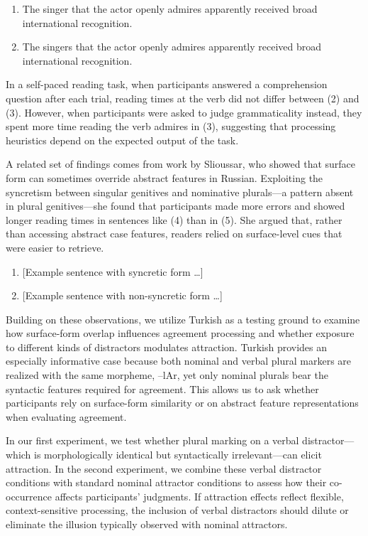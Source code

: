 \documentclass[
  authoryear,
  preprint]{elsarticle}
\providecommand{\tightlist}{%
  \setlength{\itemsep}{0pt}\setlength{\parskip}{0pt}}
\begin{document}
\begin{enumerate}
\def\labelenumi{\arabic{enumi}.}
\setcounter{enumi}{1}
\tightlist
\item
  The singer that the actor openly admires apparently received broad
  international recognition.
\item
  The singers that the actor openly admires apparently received broad
  international recognition.
\end{enumerate}

In a self-paced reading task, when participants answered a comprehension
question after each trial, reading times at the verb did not differ
between (2) and (3). However, when participants were asked to judge
grammaticality instead, they spent more time reading the verb admires in
(3), suggesting that processing heuristics depend on the expected output
of the task.

A related set of findings comes from work by Slioussar, who showed that
surface form can sometimes override abstract features in Russian.
Exploiting the syncretism between singular genitives and nominative
plurals---a pattern absent in plural genitives---she found that
participants made more errors and showed longer reading times in
sentences like (4) than in (5). She argued that, rather than accessing
abstract case features, readers relied on surface-level cues that were
easier to retrieve.

\begin{enumerate}
\def\labelenumi{\arabic{enumi}.}
\setcounter{enumi}{3}
\tightlist
\item
  {[}Example sentence with syncretic form \ldots{]}
\item
  {[}Example sentence with non-syncretic form \ldots{]}
\end{enumerate}

Building on these observations, we utilize Turkish as a testing ground
to examine how surface-form overlap influences agreement processing and
whether exposure to different kinds of distractors modulates attraction.
Turkish provides an especially informative case because both nominal and
verbal plural markers are realized with the same morpheme, --lAr, yet
only nominal plurals bear the syntactic features required for agreement.
This allows us to ask whether participants rely on surface-form
similarity or on abstract feature representations when evaluating
agreement.

In our first experiment, we test whether plural marking on a verbal
distractor---which is morphologically identical but syntactically
irrelevant---can elicit attraction. In the second experiment, we combine
these verbal distractor conditions with standard nominal attractor
conditions to assess how their co-occurrence affects participants'
judgments. If attraction effects reflect flexible, context-sensitive
processing, the inclusion of verbal distractors should dilute or
eliminate the illusion typically observed with nominal attractors.
\end{document}

